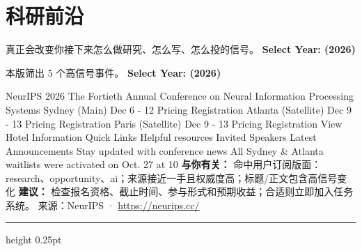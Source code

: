 \documentclass[10.5pt]{ctexart}
\begin{document}
\section*{科研前沿}
{\color{ormuted} 真正会改变你接下来怎么做研究、怎么写、怎么投的信号。}
\vspace{2mm}
{\LARGE\bfseries Select Year: (2026)}\par
\vspace{1mm}
{\color{ormuted} 本版筛出 5 个高信号事件。}
\vspace{3mm}
{\Large\bfseries Select Year: (2026)}\par
NeurIPS 2026 The Fortieth Annual Conference on Neural Information Processing Systems Sydney (Main) Dec 6 - 12 Pricing Registration Atlanta (Satellite) Dec 9 - 13 Pricing Registration Paris (Satellite) Dec 9 - 13 Pricing Registration View Hotel Information Quick Links Helpful resources Invited Speakers Latest Announcements Stay updated with conference news All Sydney \& Atlanta waitlists were activated on Oct. 27 at 10
\textbf{与你有关：} 命中用户订阅版面：research、opportunity、ai；来源接近一手且权威度高；标题/正文包含高信号变化
\textbf{建议：} 检查报名资格、截止时间、参与形式和预期收益；合适则立即加入任务系统。
{\footnotesize\color{ormuted} 来源：NeurIPS · \url{https://neurips.cc/}}
\vspace{4mm}
\hrule height 0.25pt
\vspace{3mm}
\end{document}
